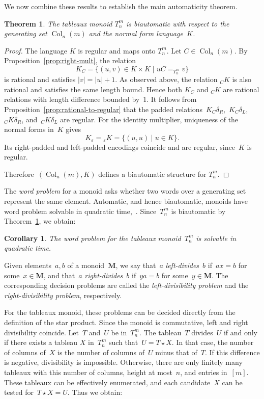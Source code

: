 \documentclass[a4paper, twoside, 11pt, english]{article}
\theoremstyle{plain}
\newtheorem{theorem}[subsubsection]{Theorem}
\newtheorem{corollary}[subsubsection]{Corollary}
\theoremstyle{definition}
\DeclareMathOperator{\col}{Col}
\newcommand{\M}{\mathbf{M}}
\begin{document}
We now combine these results to establish the main automaticity theorem.


\begin{theorem}
\label{thm:biautomatic}
The tableaux monoid $T_n^m$ is biautomatic with respect to the
generating set $\col_n(m)$ and the normal form language~$K$.
\end{theorem}



\begin{proof}
The language $K$ is regular and maps onto $T_n^m$.
Let $C\in\col_n(m)$.
By Proposition~\ref{prop:right-mult}, the relation
\[
K_C=\{(u,v)\in K\times K\mid uC =_{T_n^m} v\}
\]
is rational and satisfies $|v|=|u|+1$.
As observed above, the relation ${}_C K$ is also rational and satisfies
the same length bound.
Hence both $K_C$ and ${}_C K$ are rational relations with length
difference bounded by~$1$.
It follows from Proposition~\ref{prop:rational-to-regular} that the
padded relations~$K_C\delta_R$,~$K_C\delta_L$,~${}_C K\delta_R$, and~${}_C K\delta_L$
are regular.
For the identity multiplier, uniqueness of the normal forms in~$K$
gives
\[
K_\varepsilon={}_\varepsilon K
=\{(u,u)\mid u\in K\}.
\]
Its right-padded and left-padded encodings coincide and are regular,
since~$K$ is regular.

Therefore~$(\col_n(m),K)$ defines a biautomatic structure for $T_n^m$.
\end{proof}



The \emph{word problem} for a monoid asks whether two words over
a generating set represent the same element.
Automatic, and hence biautomatic, monoids have word problem
solvable in quadratic time,~\cite[Corollary~3.7]{CRRT01}.
Since~$T_n^m$ is biautomatic by
Theorem~\ref{thm:biautomatic}, we obtain:

\begin{corollary}
\label{cor:word-problem}
The word problem for the tableaux monoid~$T_n^m$ is solvable
in quadratic time.
\end{corollary}

Given elements~$a,b$ of a monoid~$\M$, we say that~$a$
\emph{left-divides}~$b$ if~$ax=b$ for some~$x\in\M$, and
that~$a$ \emph{right-divides}~$b$ if~$ya=b$ for some~$y\in\M$.
The corresponding decision problems are called the \emph{left-divisibility problem} and the \emph{right-divisibility problem}, respectively.

For the tableaux monoid, these problems can be decided directly
from the definition of the star product.
Since the monoid is commutative, left and right divisibility
coincide.
Let~$T$ and~$U$ be in~$T_n^m$.
The tableau~$T$ divides~$U$ if and only if there exists a tableau
$X$ in~$T_n^m$ such that~$U=T\star X$.
In that case, the number of columns of~$X$ is the number of
columns of~$U$ minus that of~$T$.
If this difference is negative, divisibility is impossible.
Otherwise, there are only finitely many tableaux with this
number of columns, height at most~$n$, and entries in~$[m]$.
These tableaux can be effectively enumerated, and each
candidate~$X$ can be tested for~$T\star X=U$.
Thus we obtain:
\end{document}
